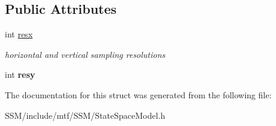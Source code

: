 \subsection*{Public Attributes}
\begin{DoxyCompactItemize}
\item 
\hypertarget{structSSMParams_ae910f170fad4799a01d4671681b151ff}{int \hyperlink{structSSMParams_ae910f170fad4799a01d4671681b151ff}{resx}}\label{structSSMParams_ae910f170fad4799a01d4671681b151ff}

\begin{DoxyCompactList}\small\item\em horizontal and vertical sampling resolutions \end{DoxyCompactList}\item 
\hypertarget{structSSMParams_aeb07c6b16efe796d2753dd7ef263db6f}{int {\bfseries resy}}\label{structSSMParams_aeb07c6b16efe796d2753dd7ef263db6f}

\end{DoxyCompactItemize}


The documentation for this struct was generated from the following file\-:\begin{DoxyCompactItemize}
\item 
S\-S\-M/include/mtf/\-S\-S\-M/State\-Space\-Model.\-h\end{DoxyCompactItemize}
